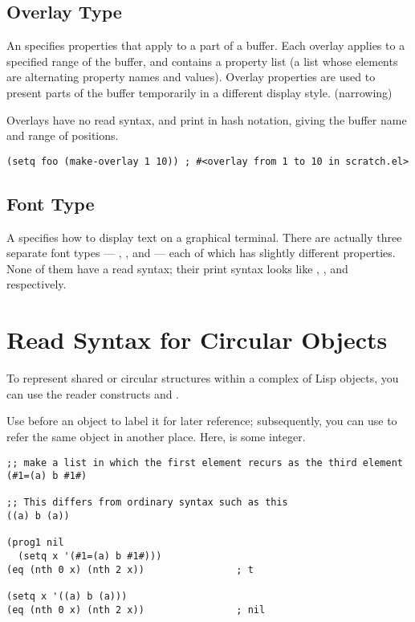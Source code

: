 \subsection{Overlay Type}
\label{sec:overlay-type}

An  specifies properties that apply to a part of a buffer.
Each overlay applies to a specified range of the buffer, and contains a property list (a list whose elements are alternating property names and values).
Overlay properties are used to present parts of the buffer temporarily in a different display style. (narrowing)

Overlays have no read syntax, and print in hash notation, giving the buffer name and range of positions.
\begin{lstlisting}
(setq foo (make-overlay 1 10)) ; #<overlay from 1 to 10 in scratch.el>
\end{lstlisting}


\subsection{Font Type}
\label{sec:font-type}

A  specifies how to display text on a graphical terminal.
There are actually three separate font types — , , and  — each of which has slightly different properties.
None of them have a read syntax; their print syntax looks like , , and  respectively.



\section{Read Syntax for Circular Objects}
\label{sec:read-syntax-circular}

To represent shared or circular structures within a complex of Lisp objects, you can use the reader constructs  and .

Use  before an object to label it for later reference; subsequently, you can use  to refer the same object in another place.
Here,  is some integer.

\begin{lstlisting}
;; make a list in which the first element recurs as the third element
(#1=(a) b #1#)

;; This differs from ordinary syntax such as this
((a) b (a))

(prog1 nil
  (setq x '(#1=(a) b #1#)))
(eq (nth 0 x) (nth 2 x))                ; t

(setq x '((a) b (a)))
(eq (nth 0 x) (nth 2 x))                ; nil
\end{lstlisting}


